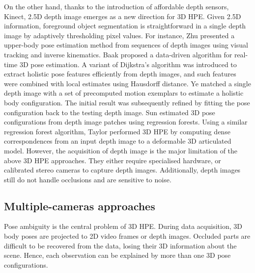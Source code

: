 On the other hand, thanks to the introduction of affordable depth sensors, \eg Kinect, 2.5D depth image emerges as a new direction for 3D HPE.
Given 2.5D information, foreground object segmentation is straightforward in a single depth image by adaptively thresholding pixel values.   
For instance, Zhu \etal \cite{Zhu2008a} presented a upper-body pose estimation method from sequences of depth images using visual tracking and inverse kinematics. 
Baak \etal \cite{Baak2011} proposed a data-driven algorithm for real-time 3D pose estimation. A variant of Dijkstra's algorithm was introduced to extract holistic pose features efficiently from depth images, and such features were combined with local estimates using Hausdorff distance. 
Ye \etal \cite{Ye2011} matched a single depth image with a set of precomputed motion exemplars to estimate a holistic body configuration. The initial result was subsequently refined by fitting the pose configuration back to the testing depth image. 
Sun \etal \cite{Sun2012} estimated 3D pose configurations from depth image patches using regression forests.  
Using a similar regression forest algorithm, Taylor \etal \cite{Taylor2012} performed 3D HPE by computing dense correspondences from an input depth image to a deformable 3D articulated model.  
However, the acquisition of depth image is the major limitation of the above 3D HPE approaches. They either require specialised hardware, or calibrated stereo cameras to capture depth images. Additionally, depth images still do not handle occlusions and are sensitive to noise. 



\subsection{Multiple-cameras approaches} 

Pose ambiguity is the central problem of 3D HPE. 
During data acquisition, 3D body poses are projected to 2D video frames or depth images. Occluded parts are difficult to be recovered from the data, losing their 3D information about the scene. Hence, each observation can be explained by more than one 3D pose configurations. 

